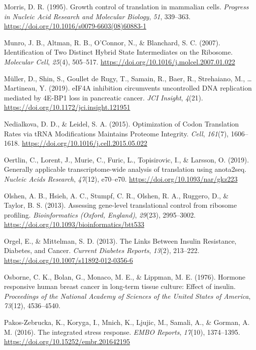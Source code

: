 \documentclass[12pt,openany]{book}
\begin{document}
\hypertarget{ref-Morris1995}{}
Morris, D. R. (1995). Growth control of translation in mammalian cells.
\emph{Progress in Nucleic Acid Research and Molecular Biology},
\emph{51}, 339--363. \url{https://doi.org/10.1016/s0079-6603(08)60883-1}

\hypertarget{ref-Munro2007}{}
Munro, J. B., Altman, R. B., O'Connor, N., \& Blanchard, S. C. (2007).
Identification of Two Distinct Hybrid State Intermediates on the
Ribosome. \emph{Molecular Cell}, \emph{25}(4), 505--517.
\url{https://doi.org/10.1016/j.molcel.2007.01.022}

\hypertarget{ref-Muller2019}{}
Müller, D., Shin, S., Goullet de Rugy, T., Samain, R., Baer, R.,
Strehaiano, M., \ldots{} Martineau, Y. (2019). eIF4A inhibition
circumvents uncontrolled DNA replication mediated by 4E-BP1 loss in
pancreatic cancer. \emph{JCI Insight}, \emph{4}(21).
\url{https://doi.org/10.1172/jci.insight.121951}

\hypertarget{ref-Nedialkova2015}{}
Nedialkova, D. D., \& Leidel, S. A. (2015). Optimization of Codon
Translation Rates via tRNA Modifications Maintains Proteome Integrity.
\emph{Cell}, \emph{161}(7), 1606--1618.
\url{https://doi.org/10.1016/j.cell.2015.05.022}

\hypertarget{ref-Oertlin2019}{}
Oertlin, C., Lorent, J., Murie, C., Furic, L., Topisirovic, I., \&
Larsson, O. (2019). Generally applicable transcriptome-wide analysis of
translation using anota2seq. \emph{Nucleic Acids Research},
\emph{47}(12), e70--e70. \url{https://doi.org/10.1093/nar/gkz223}

\hypertarget{ref-Olshen2013}{}
Olshen, A. B., Hsieh, A. C., Stumpf, C. R., Olshen, R. A., Ruggero, D.,
\& Taylor, B. S. (2013). Assessing gene-level translational control from
ribosome profiling. \emph{Bioinformatics (Oxford, England)},
\emph{29}(23), 2995--3002.
\url{https://doi.org/10.1093/bioinformatics/btt533}

\hypertarget{ref-Orgel2013}{}
Orgel, E., \& Mittelman, S. D. (2013). The Links Between Insulin
Resistance, Diabetes, and Cancer. \emph{Current Diabetes Reports},
\emph{13}(2), 213--222. \url{https://doi.org/10.1007/s11892-012-0356-6}

\hypertarget{ref-Osborne1976}{}
Osborne, C. K., Bolan, G., Monaco, M. E., \& Lippman, M. E. (1976).
Hormone responsive human breast cancer in long-term tissue culture:
Effect of insulin. \emph{Proceedings of the National Academy of Sciences
of the United States of America}, \emph{73}(12), 4536--4540.

\hypertarget{ref-Pakos-Zebrucka2016}{}
Pakos-Zebrucka, K., Koryga, I., Mnich, K., Ljujic, M., Samali, A., \&
Gorman, A. M. (2016). The integrated stress response. \emph{EMBO
Reports}, \emph{17}(10), 1374--1395.
\url{https://doi.org/10.15252/embr.201642195}
\end{document}
